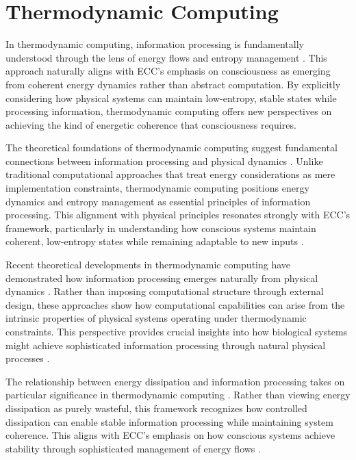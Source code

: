 \section{Thermodynamic Computing}

In thermodynamic computing, information processing is fundamentally understood through the lens of energy flows and entropy management \cite{Bennett2019}. This approach naturally aligns with ECC's emphasis on consciousness as emerging from coherent energy dynamics rather than abstract computation. By explicitly considering how physical systems can maintain low-entropy, stable states while processing information, thermodynamic computing offers new perspectives on achieving the kind of energetic coherence that consciousness requires.

The theoretical foundations of thermodynamic computing suggest fundamental connections between information processing and physical dynamics \cite{Boyd2020}. Unlike traditional computational approaches that treat energy considerations as mere implementation constraints, thermodynamic computing positions energy dynamics and entropy management as essential principles of information processing. This alignment with physical principles resonates strongly with ECC's framework, particularly in understanding how conscious systems maintain coherent, low-entropy states while remaining adaptable to new inputs \cite{England2018}.

Recent theoretical developments in thermodynamic computing have demonstrated how information processing emerges naturally from physical dynamics \cite{Ganesh2021}. Rather than imposing computational structure through external design, these approaches show how computational capabilities can arise from the intrinsic properties of physical systems operating under thermodynamic constraints. This perspective provides crucial insights into how biological systems might achieve sophisticated information processing through natural physical processes \cite{Hinrichsen2019}.

The relationship between energy dissipation and information processing takes on particular significance in thermodynamic computing \cite{Kolchinsky2020}. Rather than viewing energy dissipation as purely wasteful, this framework recognizes how controlled dissipation can enable stable information processing while maintaining system coherence. This aligns with ECC's emphasis on how conscious systems achieve stability through sophisticated management of energy flows \cite{Maroney2019}.

